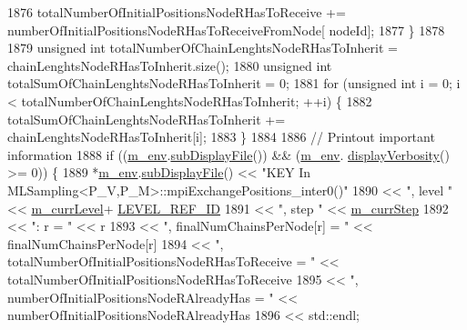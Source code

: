 \begin{DoxyCode}
1876       totalNumberOfInitialPositionsNodeRHasToReceive += numberOfInitialPositionsNodeRHasToReceiveFromNode[
      nodeId];
1877     \}
1878 
1879     \textcolor{keywordtype}{unsigned} \textcolor{keywordtype}{int} totalNumberOfChainLenghtsNodeRHasToInherit = chainLenghtsNodeRHasToInherit.size();
1880     \textcolor{keywordtype}{unsigned} \textcolor{keywordtype}{int} totalSumOfChainLenghtsNodeRHasToInherit = 0;
1881     \textcolor{keywordflow}{for} (\textcolor{keywordtype}{unsigned} \textcolor{keywordtype}{int} i = 0; i < totalNumberOfChainLenghtsNodeRHasToInherit; ++i) \{
1882       totalSumOfChainLenghtsNodeRHasToInherit += chainLenghtsNodeRHasToInherit[i];
1883     \}
1884 
1886     \textcolor{comment}{// Printout important information}
1888 \textcolor{comment}{}    \textcolor{keywordflow}{if} ((\hyperlink{class_q_u_e_s_o_1_1_m_l_sampling_a13f1ca4fe9f94822fe572a743eaced1d}{m\_env}.\hyperlink{class_q_u_e_s_o_1_1_base_environment_a8a0064746ae8dddfece4229b9ad374d6}{subDisplayFile}()) && (\hyperlink{class_q_u_e_s_o_1_1_m_l_sampling_a13f1ca4fe9f94822fe572a743eaced1d}{m\_env}.
      \hyperlink{class_q_u_e_s_o_1_1_base_environment_a1fe5f244fc0316a0ab3e37463f108b96}{displayVerbosity}() >= 0)) \{
1889       *\hyperlink{class_q_u_e_s_o_1_1_m_l_sampling_a13f1ca4fe9f94822fe572a743eaced1d}{m\_env}.\hyperlink{class_q_u_e_s_o_1_1_base_environment_a8a0064746ae8dddfece4229b9ad374d6}{subDisplayFile}() << \textcolor{stringliteral}{"KEY In
       MLSampling<P\_V,P\_M>::mpiExchangePositions\_inter0()"}
1890                               << \textcolor{stringliteral}{", level "} << \hyperlink{class_q_u_e_s_o_1_1_m_l_sampling_af9416874c856e50f3b35270e801f17e4}{m\_currLevel}+
      \hyperlink{_m_l_sampling_level_options_8h_a68d15eaf394d210effcf584b938206d3}{LEVEL\_REF\_ID}
1891                               << \textcolor{stringliteral}{", step "}  << \hyperlink{class_q_u_e_s_o_1_1_m_l_sampling_a1b1f8ccb4823bdfa26ec652f0807c63e}{m\_currStep}
1892                               << \textcolor{stringliteral}{": r = "}                                              << r
1893                               << \textcolor{stringliteral}{", finalNumChainsPerNode[r] = "}                       << 
      finalNumChainsPerNode[r]
1894                               << \textcolor{stringliteral}{", totalNumberOfInitialPositionsNodeRHasToReceive = "} << 
      totalNumberOfInitialPositionsNodeRHasToReceive
1895                               << \textcolor{stringliteral}{", numberOfInitialPositionsNodeRAlreadyHas = "}        << 
      numberOfInitialPositionsNodeRAlreadyHas
1896                               << std::endl;

\end{DoxyCode}
